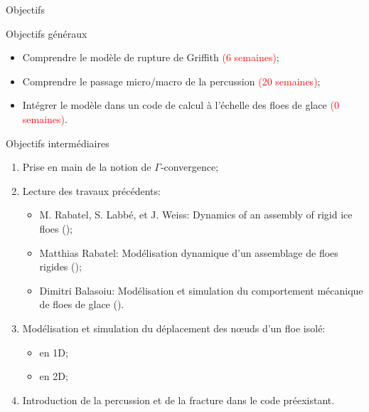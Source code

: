 \begin{frame}{Objectifs}

  \begin{exampleblock}{Objectifs généraux}

    \begin{itemize}
      \item Comprendre le modèle de rupture de Griffith \textcolor{red}{(6 semaines)}; 
      \item Comprendre le passage micro/macro de la percussion \textcolor{red}{(20 semaines)};
      \item Intégrer le modèle dans un code de calcul à l’échelle des floes de glace \textcolor{red}{(0 semaines)}.
    \end{itemize}
  \end{exampleblock}

  \pause

  \begin{block}{Objectifs intermédiaires}

    \begin{enumerate}
      \item Prise en main de la notion de $\Gamma$‑convergence;
      \item Lecture des travaux précédents:
      \begin{itemize}
        \item \alert{M. Rabatel, S. Labbé, et J. Weiss}: Dynamics of an assembly of rigid ice floes (\citeyear{rabatel2015dynamics}); 
        \item \alert{Matthias Rabatel}: Modélisation dynamique d’un assemblage de floes rigides (\citeyear{rabatel2015modelisation});
        \item \alert{Dimitri Balasoiu}: Modélisation et simulation du comportement mécanique de floes de glace (\citeyear{balasoiu2020modelisation}).
      \end{itemize}
      
      \item Modélisation et simulation du déplacement des n\oe{}uds d'un floe isolé:
      \begin{itemize}
        \item en 1D;
        \item en 2D;
      \end{itemize}

      \item Introduction de la percussion et de la fracture dans le code préexistant.

    \end{enumerate}
  \end{block}

\end{frame}
